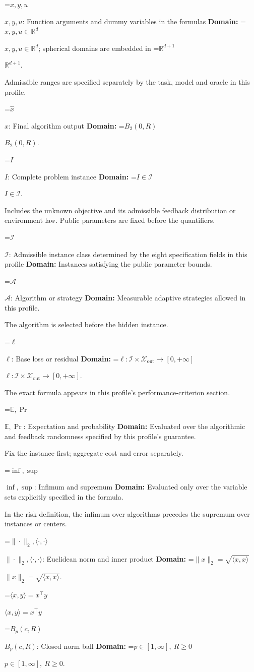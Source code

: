 \documentclass[10pt,a4paper]{article}
\newcommand{\AtlasMath}[1]{\par\begingroup\centering\setbox0=\hbox{$\displaystyle #1$}\ifdim\wd0>1.4\linewidth\typeout{ATLAS WIDE FORMULA: \the\wd0}\fi\ifdim\wd0>\linewidth\resizebox{\linewidth}{!}{\box0}\else\box0\fi\par\endgroup}
\newcommand{\AtlasInlineMath}[1]{\begingroup\setbox0=\hbox{$#1$}\ifdim\wd0>.4\linewidth\endgroup\AtlasMath{#1}\else\endgroup$#1$\fi}
\begin{document}
\AtlasInlineMath{x,y,u}: Function arguments and dummy variables in the formulas \textbf{Domain:} \AtlasInlineMath{x,y,u\in\mathbb{R}^d}; spherical domains are embedded in \AtlasInlineMath{\mathbb{R}^{d+1}}.

Admissible ranges are specified separately by the task, model and oracle in this profile.

\AtlasInlineMath{\widehat{x}}: Final algorithm output \textbf{Domain:} \AtlasInlineMath{B_2(0,R)}.

\AtlasInlineMath{I}: Complete problem instance \textbf{Domain:} \AtlasInlineMath{I\in\mathcal{I}}.

Includes the unknown objective and its admissible feedback distribution or environment law. Public parameters are fixed before the quantifiers.

\AtlasInlineMath{\mathcal{I}}: Admissible instance class determined by the eight specification fields in this profile \textbf{Domain:} Instances satisfying the public parameter bounds.

\AtlasInlineMath{\mathcal{A}}: Algorithm or strategy \textbf{Domain:} Measurable adaptive strategies allowed in this profile.

The algorithm is selected before the hidden instance.

\AtlasInlineMath{\ell}: Base loss or residual \textbf{Domain:} \AtlasInlineMath{\ell:\mathcal{I}\times\mathcal{X}_{\mathrm{out}}\to[0,+\infty]}.

The exact formula appears in this profile's performance-criterion section.

\AtlasInlineMath{\mathbb{E},\Pr}: Expectation and probability \textbf{Domain:} Evaluated over the algorithmic and feedback randomness specified by this profile's guarantee.

Fix the instance first; aggregate cost and error separately.

\AtlasInlineMath{\inf,\sup}: Infimum and supremum \textbf{Domain:} Evaluated only over the variable sets explicitly specified in the formula.

In the risk definition, the infimum over algorithms precedes the supremum over instances or centers.

\AtlasInlineMath{\|\cdot\|_2,\langle\cdot,\cdot\rangle}: Euclidean norm and inner product \textbf{Domain:} \AtlasInlineMath{\|x\|_2=\sqrt{\langle x,x\rangle}}.

\AtlasInlineMath{\langle x,y\rangle=x^\top y}

\AtlasInlineMath{B_p(c,R)}: Closed norm ball \textbf{Domain:} \AtlasInlineMath{p\in[1,\infty],\ R\ge0}.
\end{document}
